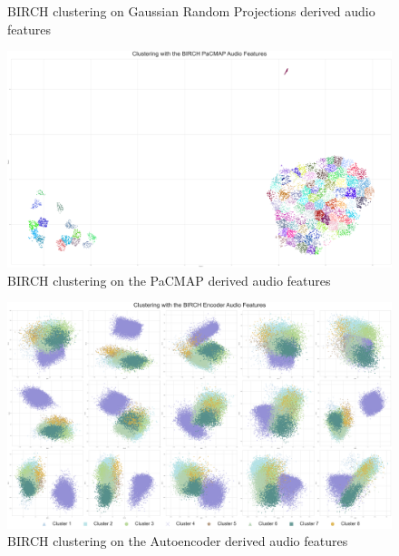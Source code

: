 \begin{appendix}
\begin{figure}[!htb]
    \caption{BIRCH clustering on Gaussian Random Projections derived audio features}
    \label{fig:birch-fourth}
\end{figure}
\begin{figure}[htp]
    \centering
    \includegraphics[scale=0.08]{Outputs/BIRCH Clustering - PaCMAP Audio Features.png}
    \caption{BIRCH clustering on the PaCMAP derived audio features}
    \label{fig:birch-fifth}
\end{figure}
\begin{figure}[htp]
    \centering
    \includegraphics[scale=0.08]{Outputs/BIRCH Clustering - Autoencoder Audio Features.png}
    \caption{BIRCH clustering on the Autoencoder derived audio features}
    \label{fig:birch-sixth}
\end{figure}
\FloatBarrier

\end{appendix}
